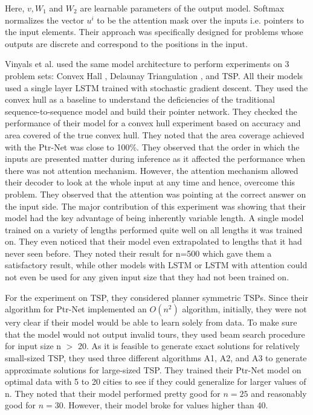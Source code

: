 \documentclass{article}
\begin{document}
Here, $v, W_1$ and $W_2$ are learnable parameters of the output model. Softmax normalizes the vector $u^i$ to be the attention mask over the inputs i.e. pointers to the input elements. Their approach was specifically designed for problems whose outputs are discrete and correspond to the positions in the input. 

Vinyals et al. used the same model architecture to perform experiments on 3 problem sets: Convex Hall \cite{graham1972efficient, jarvis1973identification}, Delaunay Triangulation \cite{rebay1993efficient}, and TSP. All their models used a single layer LSTM trained with stochastic gradient descent. They used the convex hull as a baseline to understand the deficiencies of the traditional sequence-to-sequence model and build their pointer network. They checked the performance of their model for a convex hull experiment based on accuracy and area covered of the true convex hull. They noted that the area coverage achieved with the Ptr-Net was close to 100\%. They observed that the order in which the inputs are presented matter during inference as it affected the performance when there was not attention mechanism. However, the attention mechanism allowed their decoder to look at the whole input at any time and hence, overcome this problem. They observed that the attention was pointing at the correct answer on the input side. The major contribution of this experiment was showing that their model had the key advantage of being inherently variable length. A single model trained on a variety of lengths performed quite well on all lengths it was trained on. They even noticed that their model even extrapolated to lengths that it had never seen before. They noted their result for n=500 which gave them a satisfactory result, while other models with LSTM or LSTM with attention could not even be used for any given input size that they had not been trained on. 

For the experiment on TSP, they considered planner symmetric TSPs. Since their algorithm for Ptr-Net implemented an $O(n^2)$ algorithm, initially, they were not very clear if their model would be able to learn solely from data. To make sure that the model would not output invalid tours, they used beam search procedure for input size n $>$ 20. As it is feasible to generate exact solutions for relatively small-sized TSP, they used three different algorithms A1, A2, and A3 to generate approximate solutions for large-sized TSP. They trained their Ptr-Net model on optimal data with 5 to 20 cities to see if they could generalize for larger values of n. They noted that their model performed pretty good for $n = 25$ and reasonably good for $n = 30$. However, their model broke for values higher than 40. 
\end{document}
